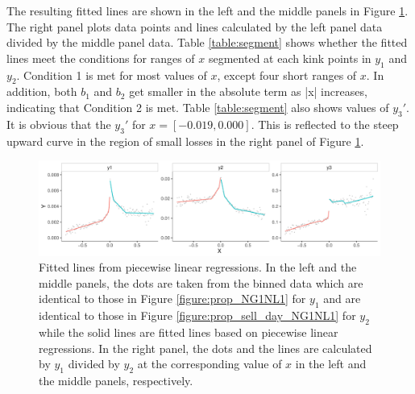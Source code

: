 \documentclass[11pt, a4paper]{article}
\begin{document}
The resulting fitted lines are shown in the left and the middle panels in Figure \ref{figure:segment}. The right panel plots data points and lines calculated by the left panel data divided by the middle panel data.
Table \ref{table:segment} shows whether the fitted lines meet the conditions for ranges of $x$ segmented at each kink points in $y_1$ and $y_2$. Condition 1 is met for most values of $x$, except four short ranges of $x$. In addition, both $b_1$ and $b_2$ get smaller in the absolute term as |x| increases, indicating that Condition 2 is met.   
Table \ref{table:segment} also shows values of $y_3'$. It is obvious that the $y_3'$ for $x=[-0.019, 0.000]$. This is reflected to the steep upward curve in the region of small losses in the right panel of Figure \ref{figure:segment}.


\begin{figure}[H]
	\centering
	\hspace*{-2cm} 
	\includegraphics[width=1.2\columnwidth]{segment.pdf}
	\caption{\small Fitted lines from piecewise linear regressions. In the left and the middle panels, the dots are taken from the binned data which are identical to those in Figure \ref{figure:prop_NG1NL1} for $y_1$ and are identical to those in Figure \ref{figure:prop_sell_day_NG1NL1} for $y_2$ while the solid lines are fitted lines based on piecewise linear regressions. In the right panel, the dots and the lines are calculated by $y_1$ divided by $y_2$ at the corresponding value of $x$ in the left and the middle panels, respectively.}
	\label{figure:segment}
\end{figure}
\end{document}
